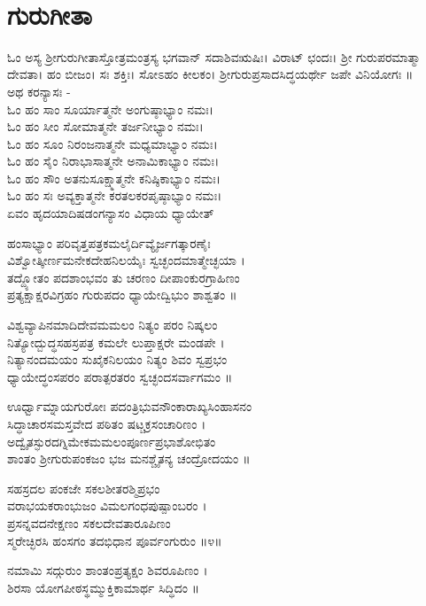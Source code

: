 ‌\chapter*{\center ಗುರುಗೀತಾ}
ಓಂ ಅಸ್ಯ ಶ್ರೀಗುರುಗೀತಾಸ್ತೋತ್ರಮಂತ್ರಸ್ಯ ಭಗವಾನ್ ಸದಾಶಿವಋಷಿಃ। ವಿರಾಟ್ ಛಂದಃ। ಶ್ರೀ ಗುರುಪರಮಾತ್ಮಾ ದೇವತಾ। ಹಂ ಬೀಜಂ। ಸಃ ಶಕ್ತಿಃ। ಸೋಽಹಂ ಕೀಲಕಂ। ಶ್ರೀಗುರುಪ್ರಸಾದಸಿದ್ಧಯರ್ಥೇ ಜಪೇ ವಿನಿಯೋಗಃ ॥\\

ಅಥ ಕರನ್ಯಾಸಃ -\\
ಓಂ ಹಂ ಸಾಂ ಸೂರ್ಯಾತ್ಮನೇ ಅಂಗುಷ್ಠಾಭ್ಯಾಂ ನಮಃ।\\
ಓಂ ಹಂ ಸೀಂ ಸೋಮಾತ್ಮನೇ ತರ್ಜನೀಭ್ಯಾಂ ನಮಃ।\\
ಓಂ ಹಂ ಸೂಂ ನಿರಂಜನಾತ್ಮನೇ ಮಧ್ಯಮಾಭ್ಯಾಂ ನಮಃ।\\
ಓಂ ಹಂ ಸೈಂ ನಿರಾಭಾಸಾತ್ಮನೇ ಅನಾಮಿಕಾಭ್ಯಾಂ ನಮಃ।\\
ಓಂ ಹಂ ಸೌಂ ಅತನುಸೂಕ್ಷ್ಮಾತ್ಮನೇ ಕನಿಷ್ಠಿಕಾಭ್ಯಾಂ ನಮಃ।\\
ಓಂ ಹಂ ಸಃ ಅವ್ಯಕ್ತಾತ್ಮನೇ ಕರತಲಕರಪೃಷ್ಠಾಭ್ಯಾಂ ನಮಃ।\\
ಏವಂ ಹೃದಯಾದಿಷಡಂಗನ್ಯಾಸಂ ವಿಧಾಯ ಧ್ಯಾಯೇತ್\-

ಹಂಸಾಭ್ಯಾಂ ಪರಿವೃತ್ತಪತ್ರಕಮಲೈರ್ದಿವ್ಯೈರ್ಜಗತ್ಕಾರಣೈಃ\\
ವಿಶ್ವೋತ್ಕೀರ್ಣಮನೇಕದೇಹನಿಲಯೈಃ ಸ್ವಚ್ಛಂದಮಾತ್ಮೇಚ್ಛಯಾ ।\\
ತದ್ದ್ಯೋತಂ ಪದಶಾಂಭವಂ ತು ಚರಣಂ ದೀಪಾಂಕುರಗ್ರಾಹಿಣಂ\\
ಪ್ರತ್ಯಕ್ಷಾಕ್ಷರವಿಗ್ರಹಂ ಗುರುಪದಂ ಧ್ಯಾಯೇದ್ವಿಭುಂ ಶಾಶ್ವತಂ ॥

ವಿಶ್ವವ್ಯಾಪಿನಮಾದಿದೇವಮಮಲಂ ನಿತ್ಯಂ ಪರಂ ನಿಷ್ಕಲಂ\\
ನಿತ್ಯೋದ್ಬುದ್ಧಸಹಸ್ರಪತ್ರ ಕಮಲೇ ಲುಪ್ತಾಕ್ಷರೇ ಮಂಡಪೇ ।\\
ನಿತ್ಯಾನಂದಮಯಂ ಸುಖೈಕನಿಲಯಂ ನಿತ್ಯಂ ಶಿವಂ ಸ್ವಪ್ರಭಂ\\
ಧ್ಯಾಯೇದ್ಧಂಸಪರಂ ಪರಾತ್ಪರತರಂ ಸ್ವಚ್ಛಂದಸರ್ವಾಗಮಂ ॥

ಊರ್ಧ್ವಾಮ್ನಾಯಗುರೋಃ ಪದಂತ್ರಿಭುವನೌಂಕಾರಾಖ್ಯಸಿಂಹಾಸನಂ\\
ಸಿದ್ಧಾಚಾರಸಮಸ್ತವೇದ ಪಠಿತಂ ಷಟ್ಚಕ್ರಸಂಚಾರಿಣಂ ।\\
ಅದ್ವೈತಸ್ಫುರದಗ್ನಿಮೇಕಮಮಲಂಪೂರ್ಣಪ್ರಭಾಶೋಭಿತಂ\\
ಶಾಂತಂ ಶ್ರೀಗುರುಪಂಕಜಂ ಭಜ ಮನಶ್ಚೈತನ್ಯ ಚಂದ್ರೋದಯಂ ॥

ಸಹಸ್ರದಲ ಪಂಕಜೇ ಸಕಲಶೀತರಶ್ಮಿಪ್ರಭಂ\\
ವರಾಭಯಕರಾಂಭುಜಂ ವಿಮಲಗಂಧಪುಷ್ಪಾಂಬರಂ ।\\
ಪ್ರಸನ್ನವದನೇಕ್ಷಣಂ ಸಕಲದೇವತಾರೂಪಿಣಂ\\
ಸ್ಮರೇಚ್ಛಿರಸಿ ಹಂಸಗಂ ತದಭಿಧಾನ ಪೂರ್ವಂಗುರುಂ ॥೪॥

ನಮಾಮಿ ಸದ್ಗುರುಂ ಶಾಂತಂಪ್ರತ್ಯಕ್ಷಂ ಶಿವರೂಪಿಣಂ ।\\
ಶಿರಸಾ ಯೋಗಪೀಠಸ್ಥಮ್ಮುಕ್ತಿಕಾಮಾರ್ಥ ಸಿದ್ಧಿದಂ ॥

